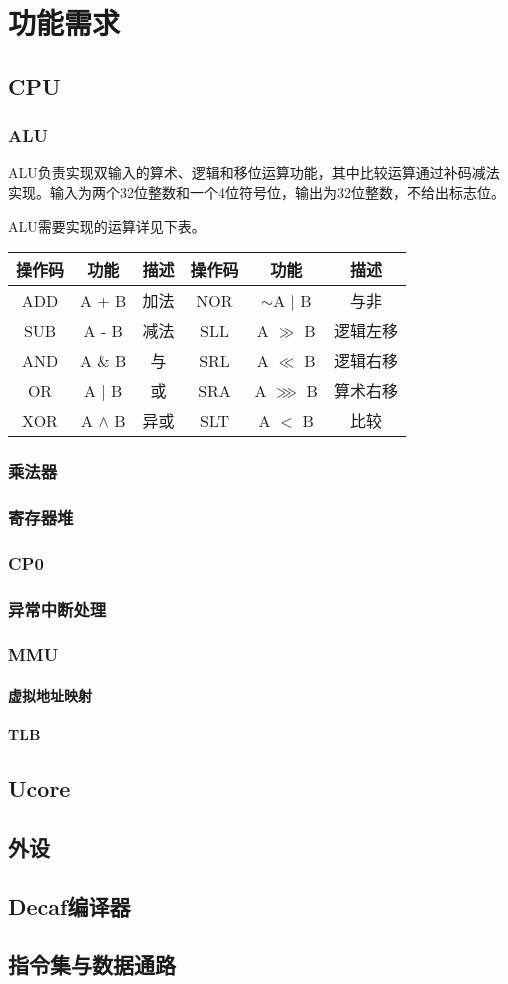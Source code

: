 \section{功能需求}
\subsection{CPU}
\subsubsection{ALU}
ALU负责实现双输入的算术、逻辑和移位运算功能，其中比较运算通过补码减法实现。输入为两个32位整数和一个4位符号位，输出为32位整数，不给出标志位。

ALU需要实现的运算详见下表。

\begin{table}[ht]
\centering
\begin{tabular}{cccccc}
\hline
操作码&功能&描述&操作码&功能&描述\\
\hline
ADD&A + B&加法&NOR&$\sim$A $\mid$ B&与非\\
SUB&A - B&减法&SLL&A $\gg$ B&逻辑左移\\
AND&A $\&$ B&与&SRL&A $\ll$ B&逻辑右移\\
OR&A $\mid$ B&或&SRA&A $\ggg$ B&算术右移\\
XOR&A $\wedge$ B&异或&SLT&A $<$ B&比较\\
\hline

\end{tabular}
\end{table}

\subsubsection{乘法器}
\subsubsection{寄存器堆}
\subsubsection{CP0}
\subsubsection{异常中断处理}
\subsubsection{MMU}
\paragraph{虚拟地址映射}
\paragraph{TLB}
\subsection{Ucore}
\subsection{外设}
\subsection{Decaf编译器}
\subsection{指令集与数据通路}
